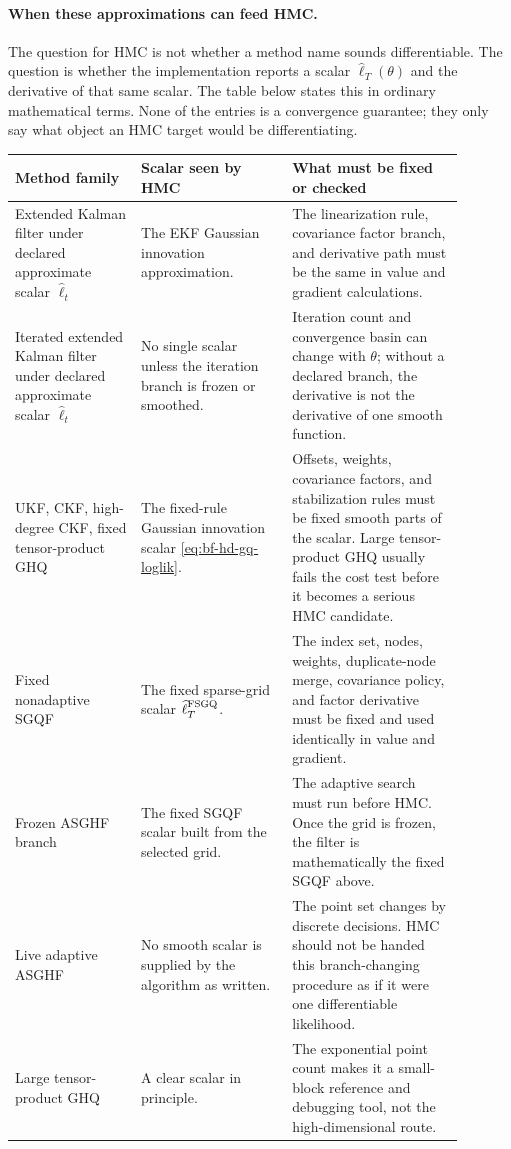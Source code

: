 \paragraph{When these approximations can feed HMC.}
The question for HMC is not whether a method name sounds differentiable.  The
question is whether the implementation reports a scalar
\(\widehat\ell_T(\theta)\) and the derivative of that same scalar.  The table
below states this in ordinary mathematical terms.  None of the entries is a
convergence guarantee; they only say what object an HMC target would be
differentiating.

\begin{longtable}{@{}p{0.25\linewidth}p{0.30\linewidth}p{0.34\linewidth}@{}}
\toprule
Method family & Scalar seen by HMC & What must be fixed or checked \\
\midrule
\endhead
Extended Kalman filter under declared approximate scalar \(\widehat\ell_t\) &
The EKF Gaussian innovation approximation. &
The linearization rule, covariance factor branch, and derivative path must be
the same in value and gradient calculations. \\
Iterated extended Kalman filter under declared approximate scalar
\(\widehat\ell_t\) &
No single scalar unless the iteration branch is frozen or smoothed. &
Iteration count and convergence basin can change with \(\theta\); without a
declared branch, the derivative is not the derivative of one smooth function. \\
UKF, CKF, high-degree CKF, fixed tensor-product GHQ &
The fixed-rule Gaussian innovation scalar
\eqref{eq:bf-hd-gq-loglik}. &
Offsets, weights, covariance factors, and stabilization rules must be fixed
smooth parts of the scalar.  Large tensor-product GHQ usually fails the cost
test before it becomes a serious HMC candidate. \\
Fixed nonadaptive SGQF &
The fixed sparse-grid scalar
\(\widehat\ell_T^{\rm FSGQ}\). &
The index set, nodes, weights, duplicate-node merge, covariance policy, and
factor derivative must be fixed and used identically in value and gradient. \\
Frozen ASGHF branch &
The fixed SGQF scalar built from the selected grid. &
The adaptive search must run before HMC.  Once the grid is frozen, the filter
is mathematically the fixed SGQF above. \\
Live adaptive ASGHF &
No smooth scalar is supplied by the algorithm as written. &
The point set changes by discrete decisions.  HMC should not be handed this
branch-changing procedure as if it were one differentiable likelihood. \\
Large tensor-product GHQ &
A clear scalar in principle. &
The exponential point count makes it a small-block reference and debugging
tool, not the high-dimensional route. \\
\bottomrule
\end{longtable}

